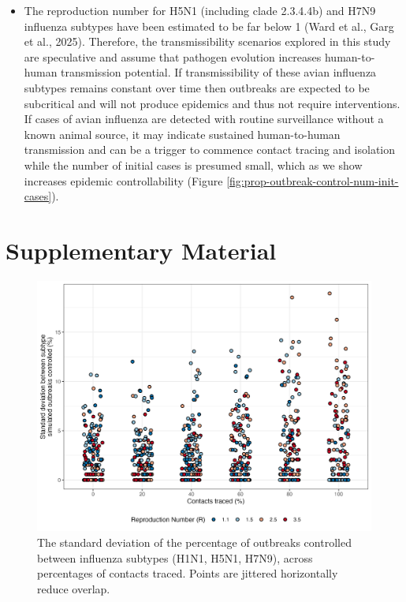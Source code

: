 \documentclass{article}
\begin{document}
\begin{itemize}
\item The reproduction number for H5N1 (including clade 2.3.4.4b) and H7N9 influenza subtypes have been estimated to be far below 1 (Ward et al., Garg et al., 2025). Therefore, the transmissibility scenarios explored in this study are speculative and assume that pathogen evolution increases human-to-human transmission potential. If transmissibility of these avian influenza subtypes remains constant over time then outbreaks are expected to be subcritical and will not produce epidemics and thus not require interventions. If cases of avian influenza are detected with routine surveillance without a known animal source, it may indicate sustained human-to-human transmission and can be a trigger to commence contact tracing and isolation while the number of initial cases is presumed small, which as we show increases epidemic controllability (Figure \ref{fig:prop-outbreak-control-num-init-cases}).
\end{itemize}




\clearpage

\section*{Supplementary Material}

\setcounter{figure}{0}
\renewcommand{\thefigure}{S\arabic{figure}}


\begin{figure}[ht]
\centering
\includegraphics[width=\textwidth]{../plots/prop_outbreak_control_var_reproduction_number.png}
\caption{The standard deviation of the percentage of outbreaks controlled between influenza subtypes (H1N1, H5N1, H7N9), across percentages of contacts traced. Points are jittered horizontally reduce overlap.}
\label{fig:prop-outbreak-control-var-R}
\end{figure}
\end{document}

